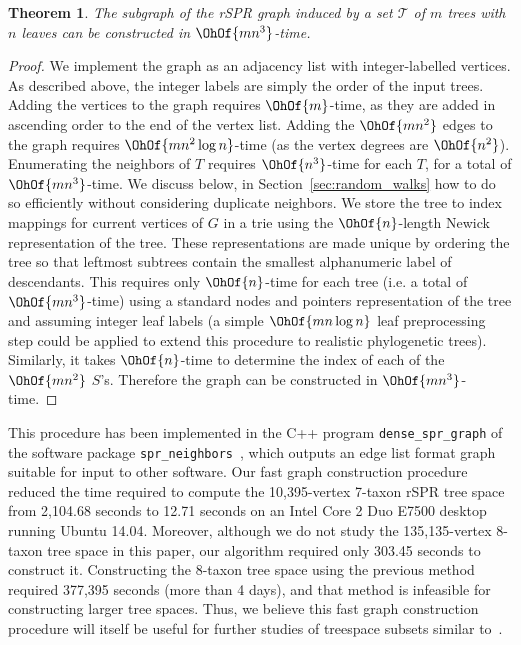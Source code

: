 \documentclass[11pt,onecolumn,conference]{IEEEtran}
\newtheorem{theorem}{Theorem}[section]
\begin{document}
\begin{theorem}
	\label{thm:construct_graph}
	The subgraph of the rSPR graph induced by a set $\mathcal{T}$ of $m$ trees with $n$ leaves can be constructed in $\OhOf{mn^3}$-time.
\end{theorem}
\begin{proof}
	We implement the graph as an adjacency list with integer-labelled vertices.
	As described above, the integer labels are simply the order of the input trees.
	Adding the vertices to the graph requires $\OhOf{m}$-time, as they are added in ascending order to the end of the vertex list.
	Adding the $\OhOf{mn^2}$ edges to the graph requires $\OhOf{mn^2 \log n}$-time (as the vertex degrees are $\OhOf{n^2}$).
	Enumerating the neighbors of $T$ requires $\OhOf{n^3}$-time for each $T$, for a total of $\OhOf{mn^3}$-time.
	We discuss below, in Section~\ref{sec:random_walks} how to do so efficiently without considering duplicate neighbors.
	We store the tree to index mappings for current vertices of $G$ in a trie using the $\OhOf{n}$-length Newick representation of the tree.
	These representations are made unique by ordering the tree so that leftmost subtrees contain the smallest alphanumeric label of descendants.
	This requires only $\OhOf{n}$-time for each tree (i.e. a total of $\OhOf{mn^3}$-time) using a standard nodes and pointers representation of the tree and assuming integer leaf labels (a simple $\OhOf{mn\log n}$ leaf preprocessing step could be applied to extend this procedure to realistic phylogenetic trees).
	Similarly, it takes $\OhOf{n}$-time to determine the index of each of the $\OhOf{mn^2}$ $S$'s.
	Therefore the graph can be constructed in $\OhOf{mn^3}$-time.
\end{proof}
This procedure has been implemented in the C++ program \texttt{dense\_spr\_graph} of the software package \texttt{spr\_neighbors}~\cite{spr_neighbors}, which outputs an edge list format graph suitable for input to other software.
Our fast graph construction procedure reduced the time required to compute the 10,395-vertex 7-taxon rSPR tree space from 2,104.68 seconds to 12.71 seconds on an Intel Core 2 Duo E7500 desktop running Ubuntu 14.04.
Moreover, although we do not study the 135,135-vertex 8-taxon tree space in this paper, our algorithm required only 303.45 seconds to construct it.
Constructing the 8-taxon tree space using the previous method required 377,395 seconds (more than 4 days), and that method is infeasible for constructing larger tree spaces.
Thus, we believe this fast graph construction procedure will itself be useful for further studies of treespace subsets similar to~\cite{Whidden2015-yi}.
\end{document}
